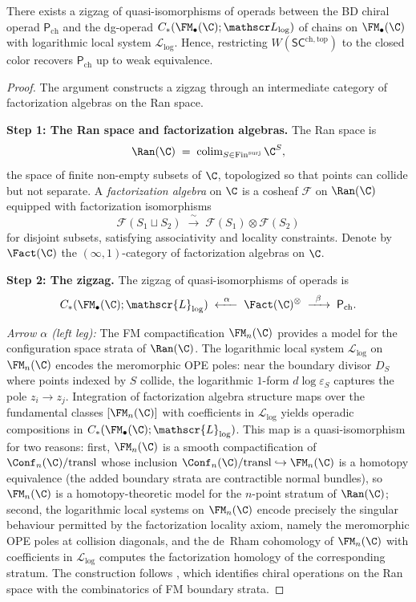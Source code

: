 \begin{theorem}
\label{thm:closed-BD}
There exists a zigzag of quasi-isomorphisms of operads between the BD chiral operad $\mathsf P_{\mathrm{ch}}$ and the dg-operad $C_\ast(\FM_\bullet(\C);\mathscr L_{\log})$ of chains on $\FM_\bullet(\C)$ with logarithmic local system $\mathscr L_{\log}$. Hence, restricting $W(\mathsf{SC}^{\mathrm{ch,top}})$ to the closed color recovers $\mathsf P_{\mathrm{ch}}$ up to weak equivalence.
\end{theorem}

\begin{proof}
The argument constructs a zigzag through an intermediate category of factorization algebras on the Ran space.

\medskip\noindent
\textbf{Step 1: The Ran space and factorization algebras.}
The Ran space is
\[
\Ran(\C) \;=\; \operatorname{colim}_{S \in \mathrm{Fin}^{\mathrm{surj}}} \C^S,
\]
the space of finite non-empty subsets of $\C$, topologized so that points can collide but not separate. A \emph{factorization algebra} on $\C$ is a cosheaf $\mathcal{F}$ on $\Ran(\C)$ equipped with factorization isomorphisms
\[
\mathcal{F}(S_1 \sqcup S_2) \;\xrightarrow{\;\sim\;}\; \mathcal{F}(S_1) \otimes \mathcal{F}(S_2)
\]
for disjoint subsets, satisfying associativity and locality constraints. Denote by $\Fact(\C)$ the $(\infty,1)$-category of factorization algebras on $\C$.

\medskip\noindent
\textbf{Step 2: The zigzag.}
The zigzag of quasi-isomorphisms of operads is
\[
C_\ast(\FM_\bullet(\C);\mathscr{L}_{\log}) \;\xleftarrow{\;\;\alpha\;\;}\; \Fact(\C)^{\otimes} \;\xrightarrow{\;\;\beta\;\;}\; \mathsf{P}_{\mathrm{ch}}.
\]

\emph{Arrow $\alpha$ (left leg):} The FM compactification $\FM_n(\C)$ provides a model for the configuration space strata of $\Ran(\C)$. The logarithmic local system $\mathscr{L}_{\log}$ on $\FM_n(\C)$ encodes the meromorphic OPE poles: near the boundary divisor $D_S$ where points indexed by $S$ collide, the logarithmic $1$-form $d\log\varepsilon_S$ captures the pole $z_i \to z_j$. Integration of factorization algebra structure maps over the fundamental classes $[\FM_n(\C)]$ with coefficients in $\mathscr{L}_{\log}$ yields operadic compositions in $C_\ast(\FM_\bullet(\C);\mathscr{L}_{\log})$. This map is a quasi-isomorphism for two reasons: first, $\FM_n(\C)$ is a smooth compactification of $\Conf_n(\C)/\mathrm{transl}$ whose inclusion $\Conf_n(\C)/\mathrm{transl} \hookrightarrow \FM_n(\C)$ is a homotopy equivalence (the added boundary strata are contractible normal bundles), so $\FM_n(\C)$ is a homotopy-theoretic model for the $n$-point stratum of $\Ran(\C)$; second, the logarithmic local systems on $\FM_n(\C)$ encode precisely the singular behaviour permitted by the factorization locality axiom, namely the meromorphic OPE poles at collision diagonals, and the de~Rham cohomology of $\FM_n(\C)$ with coefficients in $\mathscr{L}_{\log}$ computes the factorization homology of the corresponding stratum. The construction follows \cite[{\S}4.5.3]{BD04}, which identifies chiral operations on the Ran space with the combinatorics of FM boundary strata.


\end{proof}
